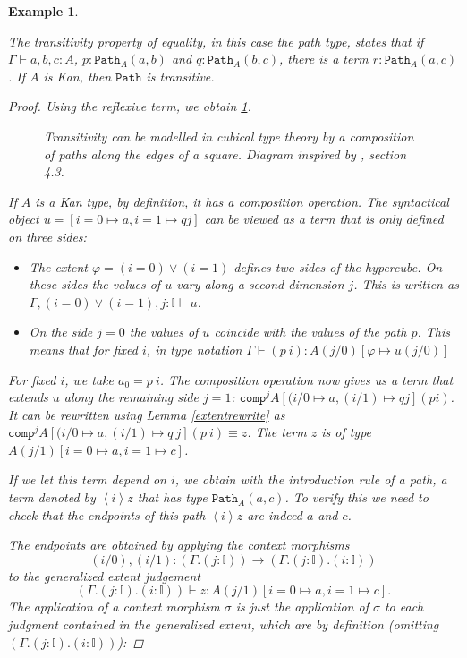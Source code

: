 \documentclass[11pt,a4paper,twoside,xetex,draft]{book}
\newcommand{\keyword}[1]{\emph{#1}\index{#1}}
\newtheorem{example}[theorem]{Example}
\newcommand{\op}[1]{\mathtt{#1}}
\newcommand{\pa}[3]{\op{Path}_{#1}\left(#2, #3\right)}
\begin{document}
\begin{example}\label{pathtransitivity}

The \keyword{transitivity} property of equality, in this case the path type, states that if $\Gamma \vdash a,b,c : A$, $p: \op{Path}_A(a,b)$ and $q: \op{Path}_A(b,c)$, there is a term $r : \op{Path}_A(a,c)$. If $A$ is Kan, then $\op{Path}$ is transitive.	

\begin{proof}
Using the reflexive term, we obtain \cref{transdiag}.

\begin{figure}\label{transdiag}

\caption{Transitivity can be modelled in cubical type theory by a  composition of paths along the edges of a square. Diagram inspired by \cite{Cohen2016}, section 4.3.}
\end{figure}

If $A$ is a Kan type, by definition, it has a composition operation. The syntactical object $u = [i=0 \mapsto a, i=1 \mapsto q j]$ can be viewed as a term that is only defined on three sides:

\begin{itemize}
\item The extent $\varphi = (i=0) \vee (i=1)$ defines two sides of the hypercube. On these sides the values of $u$ vary along a second dimension $j$. This is written as $\Gamma, (i=0)\vee (i=1), j : \mathbb{I} \vdash u$.
\item On the side $j=0$ the values of $u$ coincide with the values of the path $p$. This means that for fixed $i$, in type notation $\Gamma \vdash (p \  i) : A(j/0)[\varphi \mapsto u(j/0)]$

\end{itemize}

For fixed $i$, we take $a_0 = p \  i$. The composition operation now gives us a term that extends $u$ along the remaining side $j=1$: $\op{comp}^j A [(i/0 \mapsto a, (i/1) \mapsto q j] (p i)$. It can be rewritten using Lemma \ref{extentrewrite} as $\op{comp}^j A [(i/0 \mapsto a, (i/1) \mapsto q \ j] (p \  i) \equiv z$. The term $z$ is of type $A(j/1)[i=0 \mapsto a, i=1 \mapsto c]$.

If we let this term depend on $i$, we obtain with the introduction rule of a path, a term denoted by $\left< i \right> z$ that has type $\pa{A}{a}{c}$. To verify this we need to check that the endpoints of this path $\left< i \right> z$ are indeed $a$ and $c$.

The endpoints are obtained by applying the context morphisms $$(i/0),(i/1): (\Gamma . ( j : \mathbb{I})) \rightarrow (\Gamma. ( j : \mathbb{I}) . ( i :  \mathbb{I}))$$ to the generalized extent judgement $$(\Gamma. ( j : \mathbb{I}) . ( i :  \mathbb{I})) \vdash z : A(j/1) [i =0 \mapsto a, i=1 \mapsto c].$$ The application of a context morphism $\sigma$  is just the application of $\sigma$ to each judgment contained in the generalized extent, which are by definition (omitting $(\Gamma. ( j : \mathbb{I}) . ( i :  \mathbb{I}))$):


\end{proof}
\end{example}
\end{document}
